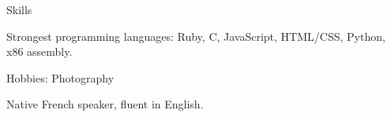 \documentclass{resume} %
\begin{document}

\begin{rSection}{Skills}
\begin{rList}
\item Strongest programming languages: Ruby, C, JavaScript, HTML/CSS, Python, x86 assembly.
\item Hobbies: Photography
\item Native French speaker, fluent in English.
\end{rList}
\end{rSection}
\end{document}
